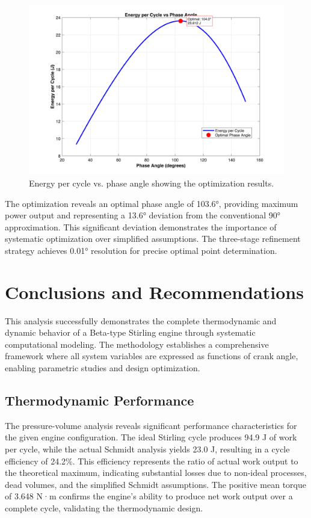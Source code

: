 \documentclass[12pt]{article}
\begin{document}
\begin{figure}[H]
  \centering
  \includegraphics[width=0.8\linewidth]{../energy_vs_phase.png}
  \caption{Energy per cycle vs. phase angle showing the optimization results.}
  \label{fig:energy_phase}
\vspace{-6pt}\end{figure}

The optimization reveals an optimal phase angle of 103.6°, providing maximum power output and representing a 13.6° deviation from the conventional 90° approximation. This significant deviation demonstrates the importance of systematic optimization over simplified assumptions. The three-stage refinement strategy achieves 0.01° resolution for precise optimal point determination.


\section{Conclusions and Recommendations}
This analysis successfully demonstrates the complete thermodynamic and dynamic behavior of a Beta-type Stirling engine through systematic computational modeling. The methodology establishes a comprehensive framework where all system variables are expressed as functions of crank angle, enabling parametric studies and design optimization.

\subsection{Thermodynamic Performance}
The pressure-volume analysis reveals significant performance characteristics for the given engine configuration. The ideal Stirling cycle produces 94.9 J of work per cycle, while the actual Schmidt analysis yields 23.0 J, resulting in a cycle efficiency of 24.2\%. This efficiency represents the ratio of actual work output to the theoretical maximum, indicating substantial losses due to non-ideal processes, dead volumes, and the simplified Schmidt assumptions. The positive mean torque of 3.648 N·m confirms the engine's ability to produce net work output over a complete cycle, validating the thermodynamic design.
\end{document}
